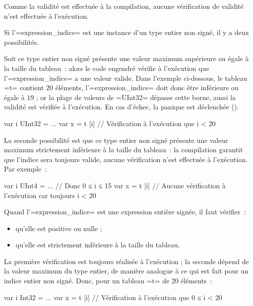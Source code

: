 Comme la validité est effectuée à la compilation, aucune vérification de validité n'est effectuée à l'exécution.



Si l'\omnibus=expression_indice= est une instance d'un type entier non signé, il y a deux possibilités.

Soit ce type entier non signé présente une valeur maximum supérieure ou égale à la taille du tableau~: alors le code engendré vérifie à l'exécution que l'\omnibus=expression_indice= a une valeur valide. Dans l'exemple ci-dessous, le tableau \omnibus=t= contient $20$ éléments, l'\omnibus=expression_indice= doit donc être inférieure ou égale à $19$ ; or la plage de valeurs de \omnibus=UInt32= dépasse cette borne, aussi la validité est vérifiée à l'exécution. En cas d'échec, la panique est déclenchée ().
\begin{OMNIBUS}
var i UInt32 = ...
var x = t [i] // Vérification à l'exécution que i < 20
\end{OMNIBUS}



La seconde possibilité est que ce type entier non signé présente une valeur maximum strictement inférieure à la taille du tableau~: la compilation garantit que l'indice sera toujours valide, aucune vérification n'est effectuée à l'exécution. Par exemple~:
\begin{OMNIBUS}
var i UInt4 = ... // Donc 0 ≤ i ≤ 15
var x = t [i] // Aucune vérification à l'exécution car toujours i < 20
\end{OMNIBUS}




Quand l'\omnibus=expression_indice= est une expression entière signée, il faut vérifier~:
\begin{itemize}
  \item qu'elle est positive ou nulle ;
  \item qu'elle est strictement inférieure à la taille du tableau.
\end{itemize}

La première vérification est toujours réalisée à l'exécution ; la seconde dépend de la valeur maximum du type entier, de manière analogue à ce qui est fait pour un indice entier non signé. Donc, pour un tableau \omnibus=t= de $20$ éléments~:

\begin{OMNIBUS}
var i Int32 = ...
var x = t [i] // Vérification à l'exécution que 0 ≤ i < 20
\end{OMNIBUS}


